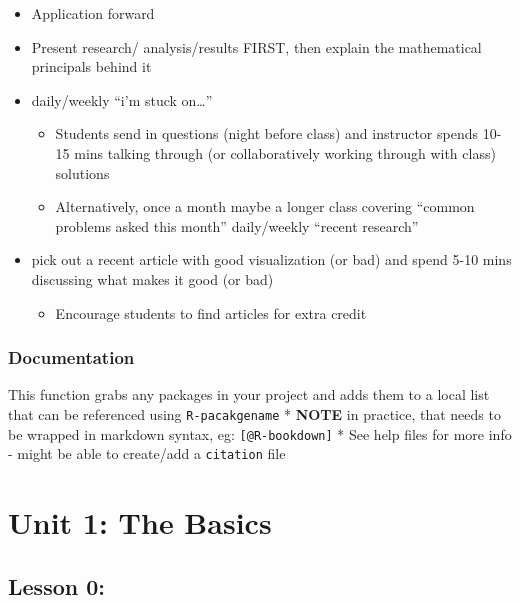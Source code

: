 \documentclass[
]{book}
\providecommand{\tightlist}{%
  \setlength{\itemsep}{0pt}\setlength{\parskip}{0pt}}
\begin{document}
\begin{itemize}
\tightlist
\item
  Application forward
\item
  Present research/ analysis/results FIRST, then explain the mathematical principals behind it
\item
  daily/weekly ``i'm stuck on\ldots{}''

  \begin{itemize}
  \tightlist
  \item
    Students send in questions (night before class) and instructor spends 10-15 mins talking through (or collaboratively working through with class) solutions
  \item
    Alternatively, once a month maybe a longer class covering ``common problems asked this month''
    daily/weekly ``recent research''
  \end{itemize}
\item
  pick out a recent article with good visualization (or bad) and spend 5-10 mins discussing what makes it good (or bad)

  \begin{itemize}
  \tightlist
  \item
    Encourage students to find articles for extra credit
  \end{itemize}
\end{itemize}

\hypertarget{documentation}{%
\subsection*{Documentation}\label{documentation}}

This function grabs any packages in your project and adds them to a local list that can be referenced using \texttt{R-pacakgename}
* \textbf{NOTE} in practice, that needs to be wrapped in markdown syntax, eg:
\texttt{{[}@R-bookdown{]}}
* See help files for more info - might be able to create/add a \texttt{citation} file

\hypertarget{unit-1-the-basics}{%
\chapter*{Unit 1: The Basics}\label{unit-1-the-basics}}

\hypertarget{lesson-0}{%
\section{Lesson 0:}\label{lesson-0}}
\end{document}
